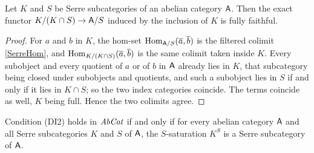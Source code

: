 \begin{lemma}
  \label{L:FullyFaithful} 
  Let \(K\) and \(S\) be Serre subcategories of an abelian category \(\mathsf{A}\). Then the exact functor \(K/(K\cap S)\to\mathsf{A}/S\) induced by the inclusion of \(K\) is fully faithful.
\end{lemma}

\begin{proof}
  
  For \(a\) and \(b\) in \(K\), the hom-set \(\operatorname{Hom}_{\mathsf{A}/S}(\overline{a},\overline{b})\) is the filtered colimit \eqref{SerreHom}, and \(\operatorname{Hom}_{K/(K\cap S)}(\overline{a},\overline{b})\) is the same colimit taken inside \(K\). Every subobject and every quotient of \(a\) or of \(b\) in \(\mathsf{A}\) already lies in \(K\), that subcategory being closed under subobjects and quotients, and such a subobject lies in \(S\) if and only if it lies in \(K\cap S\); so the two index categories coincide. The terms coincide as well, \(K\) being full. Hence the two colimits agree.
\end{proof}

\begin{proposition}
  \label{P:DIabcat} 
  Condition \textup{(DI2)} holds in \(\mathit{AbCat}\) if and only if for every abelian category \(\mathsf{A}\) and all Serre subcategories \(K\) and \(S\) of \(\mathsf{A}\), the \(S\)-saturation \(K^{S}\) is a Serre subcategory of \(\mathsf{A}\).
\end{proposition}


